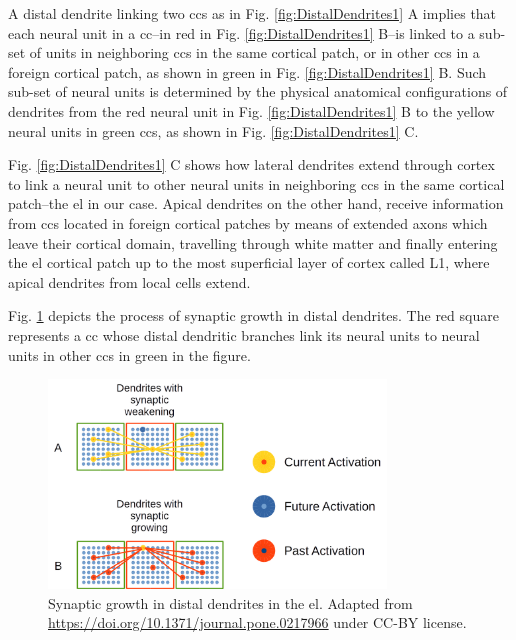 {A distal dendrite linking two \glspl{cc} as in Fig. \ref{fig:DistalDendrites1} A implies that each neural unit in a \gls{cc}--in red in Fig. \ref{fig:DistalDendrites1} B--is linked to a sub-set of units in neighboring \glspl{cc} in the same cortical patch, or in other \glspl{cc} in a foreign cortical patch, as shown in green in Fig. \ref{fig:DistalDendrites1} B. Such sub-set of neural units is determined by the physical anatomical configurations of dendrites from the red neural unit in Fig. \ref{fig:DistalDendrites1} B to the yellow neural units in green \glspl{cc}, as shown in Fig. \ref{fig:DistalDendrites1} C.

Fig. \ref{fig:DistalDendrites1} C shows how lateral dendrites extend through cortex to link a neural unit to other neural units in neighboring \glspl{cc} in the same cortical patch--the \gls{el} in our case. Apical dendrites on the other hand, receive information from \glspl{cc} located in foreign cortical patches by means of extended axons which leave their cortical domain, travelling through white matter and finally entering the \gls{el} cortical patch up to the most superficial layer of cortex called L1, where apical dendrites from local cells extend.


Fig. \ref{fig:DistalDendritesGrowth} depicts the process of synaptic growth in distal dendrites. The red square represents a \gls{cc} whose distal dendritic branches link its neural units to neural units in other \glspl{cc} in green in the figure.

\begin{figure}[ht!]
    \centering
    \includegraphics[width=0.8\textwidth]{DistalDendritesGrowth.png}
    \caption{Synaptic growth in distal dendrites in the \gls{el}.
    Adapted from \url{https://doi.org/10.1371/journal.pone.0217966} under CC-BY license.}
    \label{fig:DistalDendritesGrowth}
\end{figure}

}
